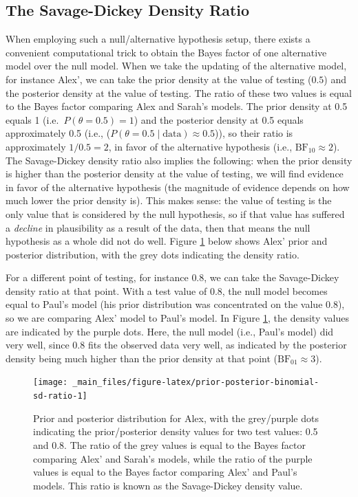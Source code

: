 \documentclass[
]{book}
\begin{document}
\hypertarget{the-savage-dickey-density-ratio}{%
\subsection{The Savage-Dickey Density Ratio}\label{the-savage-dickey-density-ratio}}

When employing such a null/alternative hypothesis setup, there exists a convenient computational trick to obtain the Bayes factor of one alternative model over the null model. When we take the updating of the alternative model, for instance Alex', we can take the prior density at the value of testing (\(0.5\)) and the posterior density at the value of testing. The ratio of these two values is equal to the Bayes factor comparing Alex and Sarah's models. The prior density at 0.5 equals 1 (i.e.~\(P(\theta = 0.5) = 1\)) and the posterior density at 0.5 equals approximately 0.5 (i.e., (\(P(\theta = 0.5 \mid \text{data}) \approx 0.5\))), so their ratio is approximately \(1 / 0.5 = 2\), in favor of the alternative hypothesis (i.e., \(\text{BF}_{10} \approx 2\)). The Savage-Dickey density ratio also implies the following: when the prior density is higher than the posterior density at the value of testing, we will find evidence in favor of the alternative hypothesis (the magnitude of evidence depends on how much lower the prior density is). This makes sense: the value of testing is the only value that is considered by the null hypothesis, so if that value has suffered a \emph{decline} in plausibility as a result of the data, then that means the null hypothesis as a whole did not do well. Figure \ref{fig:prior-posterior-binomial-sd-ratio} below shows Alex' prior and posterior distribution, with the grey dots indicating the density ratio.

For a different point of testing, for instance \(0.8\), we can take the Savage-Dickey density ratio at that point. With a test value of 0.8, the null model becomes equal to Paul's model (his prior distribution was concentrated on the value 0.8), so we are comparing Alex' model to Paul's model. In Figure \ref{fig:prior-posterior-binomial-sd-ratio}, the density values are indicated by the purple dots. Here, the null model (i.e., Paul's model) did very well, since \(0.8\) fits the observed data very well, as indicated by the posterior density being much higher than the prior density at that point (\(\text{BF}_{01} \approx 3\)).

\begin{figure}

{\centering \texttt{[image: \_main\_files/figure-latex/prior-posterior-binomial-sd-ratio-1]} 

}

\caption{Prior and posterior distribution for Alex, with the grey/purple dots indicating the prior/posterior density values for two test values: 0.5 and 0.8. The ratio of the grey values is equal to the Bayes factor comparing Alex' and Sarah's models, while the ratio of the purple values is equal to the Bayes factor comparing Alex' and Paul's models. This ratio is known as the Savage-Dickey density value.}\label{fig:prior-posterior-binomial-sd-ratio}
\end{figure}
\end{document}
